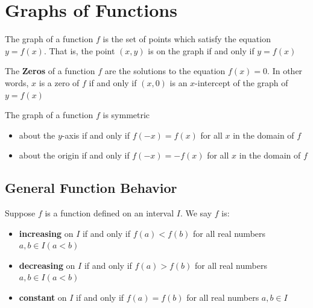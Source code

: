 \section{Graphs of Functions}

\begin{definition}
    The graph of a function $f$ is the set of points which satisfy the equation $y=f(x)$. That is, the point $(x,y)$ is on the graph if and only if $y = f(x)$
\end{definition}

\begin{definition}
    The \textbf{Zeros} of a function $f$ are the solutions to the equation $f(x) = 0$. In other words, $x$ is a zero of $f$ if and only if $(x,0)$ is an $x$-intercept of the graph of $y=f(x)$
\end{definition}

\begin{definition} 
    The graph of a function $f$ is symmetric
    \begin{itemize}
        \item about the $y$-axis if and only if $f(-x)=f(x)$ for all $x$ in the domain of $f$
        \item about the origin if and only if $f(-x) = -f(x)$ for all $x$ in the domain of $f$
    \end{itemize}
\end{definition}

\subsection{General Function Behavior}

\begin{definition}
    Suppose $f$ is a function defined on an interval $I$. We say $f$ is:
    \begin{itemize}
        \item \textbf{increasing} on $I$ if and only if $f(a) < f(b)$ for all real numbers $a, b \in I (a<b)$
        \item \textbf{decreasing} on $I$ if and only if $f(a) > f(b)$ for all real numbers $a, b \in I (a<b)$
        \item \textbf{constant} on $I$ if and only if $f(a) = f(b)$ for all real numbers $a, b \in I$
    \end{itemize}
\end{definition}

